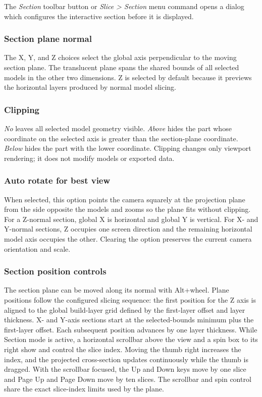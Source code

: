 The \emph{Section} toolbar button or \emph{Slice > Section} menu command opens
a dialog which configures the interactive section before it is displayed.

\subsubsection{Section plane normal}
\label{section-axis}

The X, Y, and Z choices select the global axis perpendicular to the moving
section plane. The translucent plane spans the shared bounds of all selected
models in the other two dimensions. Z is selected by default because it
previews the horizontal layers produced by normal model slicing.

\subsubsection{Clipping}
\label{section-clipping}

\emph{No} leaves all selected model geometry visible. \emph{Above} hides the
part whose coordinate on the selected axis is greater than the section-plane
coordinate. \emph{Below} hides the part with the lower coordinate. Clipping
changes only viewport rendering; it does not modify models or exported data.

\subsubsection{Auto rotate for best view}
\label{section-auto-rotate}

When selected, this option points the camera squarely at the projection plane
from the side opposite the models and zooms so the plane fits without clipping.
For a Z-normal section, global X is horizontal and global Y is vertical. For
X- and Y-normal sections, Z occupies one screen direction and the remaining
horizontal model axis occupies the other. Clearing the option preserves the
current camera orientation and scale.

\subsubsection{Section position controls}
\label{section-controls}

The section plane can be moved along its normal with Alt+wheel. Plane positions
follow the configured slicing sequence: the first
position for the Z axis is aligned to the global build-layer grid defined by
the first-layer offset and layer thickness. X- and Y-axis sections start at
the selected-bounds minimum plus the first-layer offset. Each subsequent
position advances by one layer thickness. While Section mode is
active, a horizontal scrollbar above the view and a spin box to its right show
and control the slice index. Moving the thumb right increases the index, and
the projected cross-section updates continuously while the thumb is dragged.
With the scrollbar focused, the Up and Down keys move by one slice
and Page Up and Page Down move by ten slices.
The scrollbar and spin control share the exact slice-index limits used by the
plane.

